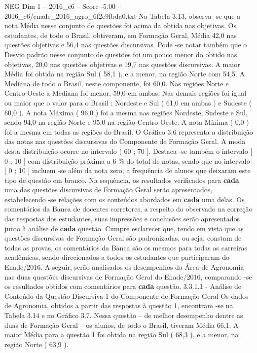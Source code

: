 \begin{textsample}{NEG Dim 1 – 2016\_c6 – Score -5.00 – 2016\_c6/enade\_2016\_agro\_6f2e9fbda0.txt}
Na Tabela 3.13, observa -se que a nota Média nesse conjunto de questões foi acima da obtida nas objetivas.
Os estudantes, de todo o Brasil, obtiveram, em Formação Geral, Média 42,0 nas questões objetivas e 56,4 nas questões discursivas.
Pode -se notar também que o Desvio padrão nesse conjunto de questões foi um pouco menor do obtido nas objetivas, 20,0 nas questões objetivas e 19,7 nas questões discursivas.
A maior Média foi obtida na região Sul ( 58,1 ), e a menor, na região Norte com 54,5.
A Mediana de todo o Brasil, neste componente, foi 60,0.
Nas regiões Norte e Centro-Oeste a Mediana foi menor, 59,0 em ambas.
Nas demais regiões foi igual ou maior que o valor para o Brasil : Nordeste e Sul ( 61,0 em ambas ) e Sudeste ( 60,0 ).
A nota Máxima ( 96,0 ) foi a mesma nas regiões Nordeste, Sudeste e Sul, sendo 94,0 na região Norte e 95,0 na região Centro-Oeste.
A nota Mínima ( 0,0 ) foi a mesma em todas as regiões do Brasil.
O Gráfico 3.6 representa a distribuição das notas nas questões discursivas do Componente de Formação Geral.
A moda desta distribuição ocorre no intervalo ( 60 ; 70 ].
Destaca -se também o intervalo [ 0 ; 10 ] com distribuição próxima a 6 \% do total de notas, sendo que no intervalo [ 0 ; 10 ] incluem -se além da nota zero, a frequência de alunos que deixaram este tipo de questão em branco.
Na sequência, os resultados verificados para \textbf{cada} uma das questões discursivas de Formação Geral serão apresentados, estabelecendo -se relações com os conteúdos abordados em \textbf{cada} uma delas.
Os comentários da Banca de docentes corretores, a respeito do observado na correção das respostas dos estudantes, suas impressões e conclusões serão apresentados junto à análise de \textbf{cada} questão.
Cumpre esclarecer que, tendo em vista que as questões discursivas de Formação Geral são padronizadas, ou seja, constam de todas as provas, os comentários da Banca são os mesmos para todas as carreiras acadêmicas, sendo direcionados a todos os estudantes que participaram do Enade/2016.
A seguir, serão analisados os desempenhos da Área de Agronomia nas duas questões discursivas de Formação Geral do Enade/2016, comparando -se os resultados obtidos com comentários para \textbf{cada} questão. 3.3.1.1 - Análise de Conteúdo da Questão Discursiva 1 do Componente de Formação Geral Os dados de Agronomia, obtidos a partir das respostas à questão 1, encontram -se na Tabela 3.14 e no Gráfico 3.7.
Nessa questão – de melhor desempenho dentre as duas de Formação Geral – os alunos, de todo o Brasil, tiveram Média 66,1.
A maior Média para a questão 1 foi obtida na região Sul ( 68,3 ), e a menor, na região Norte ( 63,9 ).

\end{textsample}
